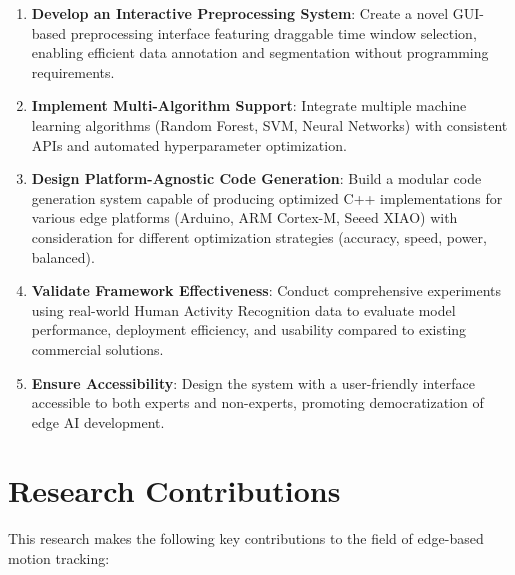 \begin{enumerate}
\item \textbf{Develop an Interactive Preprocessing System}: Create a novel GUI-based preprocessing interface featuring draggable time window selection, enabling efficient data annotation and segmentation without programming requirements.

\item \textbf{Implement Multi-Algorithm Support}: Integrate multiple machine learning algorithms (Random Forest, SVM, Neural Networks) with consistent APIs and automated hyperparameter optimization.

\item \textbf{Design Platform-Agnostic Code Generation}: Build a modular code generation system capable of producing optimized C++ implementations for various edge platforms (Arduino, ARM Cortex-M, Seeed XIAO) with consideration for different optimization strategies (accuracy, speed, power, balanced).

\item \textbf{Validate Framework Effectiveness}: Conduct comprehensive experiments using real-world Human Activity Recognition data to evaluate model performance, deployment efficiency, and usability compared to existing commercial solutions.

\item \textbf{Ensure Accessibility}: Design the system with a user-friendly interface accessible to both experts and non-experts, promoting democratization of edge AI development.

\end{enumerate}

\section{Research Contributions}

This research makes the following key contributions to the field of edge-based motion tracking:

